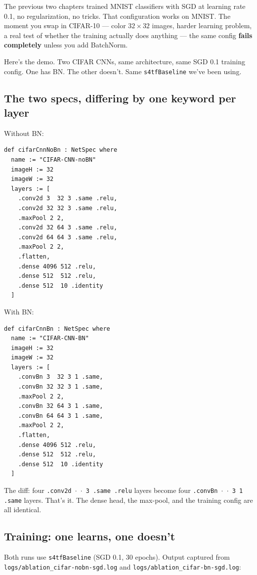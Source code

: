 The previous two chapters trained MNIST classifiers with SGD at
learning rate 0.1, no regularization, no tricks. That configuration
works on MNIST. The moment you swap in CIFAR-10 --- color
$32 \times 32$ images, harder learning problem, a real test of
whether the training actually does anything --- the same config
\textbf{fails completely} unless you add BatchNorm.

Here's the demo. Two CIFAR CNNs, same architecture, same SGD 0.1
training config. One has BN. The other doesn't. Same
\texttt{s4tfBaseline} we've been using.

\subsection*{The two specs, differing by one keyword per layer}

Without BN:

\begin{verbatim}
def cifarCnnNoBn : NetSpec where
  name := "CIFAR-CNN-noBN"
  imageH := 32
  imageW := 32
  layers := [
    .conv2d 3  32 3 .same .relu,
    .conv2d 32 32 3 .same .relu,
    .maxPool 2 2,
    .conv2d 32 64 3 .same .relu,
    .conv2d 64 64 3 .same .relu,
    .maxPool 2 2,
    .flatten,
    .dense 4096 512 .relu,
    .dense 512  512 .relu,
    .dense 512  10 .identity
  ]
\end{verbatim}

With BN:

\begin{verbatim}
def cifarCnnBn : NetSpec where
  name := "CIFAR-CNN-BN"
  imageH := 32
  imageW := 32
  layers := [
    .convBn 3  32 3 1 .same,
    .convBn 32 32 3 1 .same,
    .maxPool 2 2,
    .convBn 32 64 3 1 .same,
    .convBn 64 64 3 1 .same,
    .maxPool 2 2,
    .flatten,
    .dense 4096 512 .relu,
    .dense 512  512 .relu,
    .dense 512  10 .identity
  ]
\end{verbatim}

The diff: four \texttt{.conv2d $\cdot$ $\cdot$ 3 .same .relu} layers
become four \texttt{.convBn $\cdot$ $\cdot$ 3 1 .same} layers. That's
it. The dense head, the max-pool, and the training config are all
identical.

\subsection*{Training: one learns, one doesn't}

Both runs use \texttt{s4tfBaseline} (SGD 0.1, 30 epochs). Output
captured from \texttt{logs/ablation\_cifar-nobn-sgd.log} and
\texttt{logs/ablation\_cifar-bn-sgd.log}:

